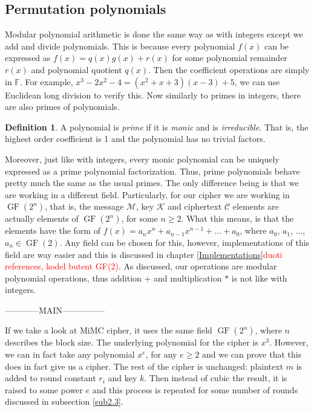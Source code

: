 \documentclass{Resources/UoBLab1}
\theoremstyle{definition}
\newtheorem{definition}[theorem]{Definition}
\begin{document}
\subsection{Permutation polynomials}
Modular polynomial arithmetic is done the same way as with integers except we add and divide polynomials. This is because every polynomial $f(x)$ can be expressed as $f(x) = q(x)g(x) + r(x)$ for some polynomial remainder $r(x)$ and polynomial quotient $q(x)$. Then the coefficient operations are simply in $\mathbb{F}$. For example, \(x^3-2x^2-4 = (x^2+x+3)(x-3) + 5\), we can use Euclidean long division to verify this. Now similarly to primes in integers, there are also primes of polynomials.
\begin{definition}
    A polynomial is \textit{prime} if it is \textit{monic} and is \textit{irreducible}. That is, the highest order coefficient is 1 and the polynomial has no trivial factors.
\end{definition}
Moreover, just like with integers, every monic polynomial can be uniquely expressed as a prime polynomial factorization. Thus, prime polynomials behave pretty much the same as the usual primes. The only difference being is that we are working in a different field. Particularly, for our cipher we are working in $\operatorname{GF}(2^n)$, that is, the message $\mathcal{M}$, key $\mathcal{K}$ and ciphertext $\mathcal{C}$ elements are actually elements of $\operatorname{GF}(2^n)$, for some $n \ge 2$. What this means, is that the elements have the form of $f(x) = a_nx^n + a_{n-1}x^{n-1} + ... + a_0$, where $a_0$, $a_1$, ..., $a_n \in \operatorname{GF}(2)$. Any field can be chosen for this, however, implementations of this field are way easier and this is discussed in chapter \ref{Implementations}\textcolor{red}{duoti references, kodel butent GF(2)}. As discussed, our operations are modular polynomial operations, thus addition $+$ and multiplication $*$ is not like with integers.

------------MAIN---------------

If we take a look at MiMC cipher\cite{MiMC}, it uses the same field $\operatorname{GF}(2^n)$, where $n$ describes the block size. The underlying polynomial for the cipher is $x^3$. However, we can in fact take any polynomial $x^e$, for any $e \ge 2$ and we can prove that this does in fact give us a cipher. The rest of the cipher is unchanged: plaintext $m$ is added to round constant $r_i$ and key $k$. Then instead of cubic the result, it is raised to some power $e$ and this process is repeated for some number of rounds discussed in subsection \ref{sub2.3}.
\end{document}
